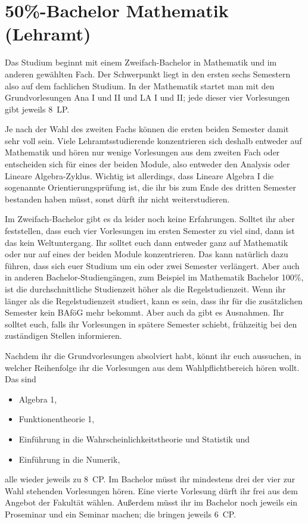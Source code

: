 \section{50\%-Bachelor Mathematik (Lehramt)}

Das Studium beginnt mit einem Zweifach-Bachelor in Mathematik und im anderen gewählten Fach. Der Schwerpunkt liegt in den ersten sechs Semestern also auf dem fachlichen Studium. In der Mathematik startet man mit den Grundvorlesungen Ana I und II und LA I und II; jede dieser vier Vorlesungen gibt jeweils 8~\gls{LP}.

Je nach der Wahl des zweiten Fachs können die ersten beiden Semester damit sehr voll sein. Viele Lehramtsstudierende konzentrieren sich deshalb entweder auf Mathematik und hören nur wenige Vorlesungen aus dem zweiten Fach oder entscheiden sich für eines der beiden Module, also entweder den Analysis oder Lineare Algebra-Zyklus. Wichtig ist allerdings, dass Lineare Algebra I die sogenannte Orientierungsprüfung ist, die ihr bis zum Ende des dritten Semester bestanden haben müsst, sonst dürft ihr nicht weiterstudieren.

Im Zweifach-Bachelor gibt es da leider noch keine Erfahrungen. Solltet ihr aber feststellen, dass euch vier Vorlesungen im ersten Semester zu viel sind, dann ist das kein Weltuntergang. Ihr solltet euch dann entweder ganz auf Mathematik oder nur auf eines der beiden Module konzentrieren. Das kann natürlich dazu führen, dass sich euer Studium um ein oder zwei Semester verlängert. Aber auch in anderen Bachelor-Studiengängen, zum Beispiel im Mathematik Bachelor 100\%, ist die durchschnittliche Studienzeit höher als die Regelstudienzeit. Wenn ihr länger als die Regelstudienzeit studiert, kann es sein, dass ihr für die zusätzlichen Semester kein BAföG mehr bekommt. Aber auch da gibt es Ausnahmen. Ihr solltet euch, falls ihr Vorlesungen in spätere Semester schiebt, frühzeitig bei den zuständigen Stellen informieren.

Nachdem ihr die Grundvorlesungen absolviert habt, könnt ihr euch aussuchen, in welcher Reihenfolge ihr die Vorlesungen aus dem Wahlpflichtbereich hören wollt. Das sind
\begin{itemize}
  \item Algebra 1,
  \item Funktionentheorie 1,
  \item Einführung in die Wahrscheinlichkeitstheorie und Statistik und
  \item Einführung in die Numerik,
\end{itemize}
alle wieder jeweils zu 8~\gls{CP}. Im Bachelor müsst ihr mindestens drei der vier zur Wahl stehenden Vorlesungen hören. Eine vierte Vorlesung dürft ihr frei aus dem Angebot der Fakultät wählen. Außerdem müsst ihr im Bachelor noch jeweils ein Proseminar und ein Seminar machen; die bringen jeweils 6~\gls{CP}.


